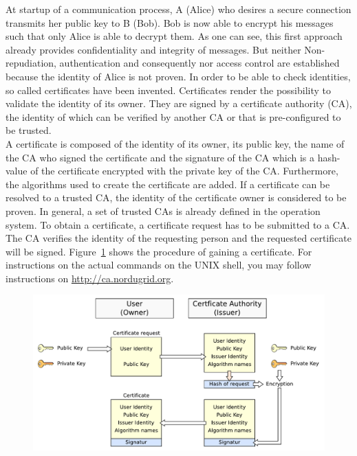 At startup of a communication process, A (Alice) who desires a secure connection transmits her public key to B (Bob).
Bob is now able to encrypt his messages such that only Alice is able to decrypt them.
As one can see, this first approach already provides confidentiality and integrity of messages.
But neither Non-repudiation, authentication and consequently nor access control are established because the identity of Alice is not proven.
In order to be able to check identities, so called certificates have been invented.
Certificates render the possibility to validate the identity of its owner.
They are signed by a certificate authority (CA), the identity of which can be verified by another CA or that is pre-configured to be trusted.\\


A certificate is composed of the identity of its owner, its public key, the name of the CA who signed the certificate and the signature of the CA which is a hash-value of the certificate encrypted with the private key of the CA. 
Furthermore, the algorithms used to create the certificate are added.
If a certificate can be resolved to a trusted CA, the identity of the certificate owner is considered to be proven. 
In general, a set of trusted CAs is already defined in the operation system.
To obtain a certificate, a certificate request has to be submitted to a CA.
The CA verifies the identity of the requesting person and the requested certificate will be signed.
Figure~\ref{fig:certificate_request} shows the procedure of gaining a certificate.
For instructions on the actual commands on the UNIX shell, you may follow instructions on \url{http://ca.nordugrid.org}.
\begin{figure}[htb]
	\centering%
 	\includegraphics[width=13cm]{tex_tls_echoservice/certificates.pdf}
	\label{fig:certificate_request}
\end{figure}
